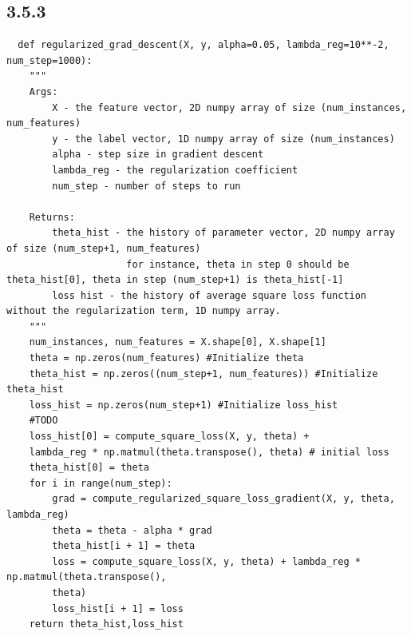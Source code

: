 \documentclass{article}
\begin{document}
\subsection{3.5.3}
\begin{verbatim}
  def regularized_grad_descent(X, y, alpha=0.05, lambda_reg=10**-2, num_step=1000):
    """
    Args:
        X - the feature vector, 2D numpy array of size (num_instances, num_features)
        y - the label vector, 1D numpy array of size (num_instances)
        alpha - step size in gradient descent
        lambda_reg - the regularization coefficient
        num_step - number of steps to run
    
    Returns:
        theta_hist - the history of parameter vector, 2D numpy array of size (num_step+1, num_features)
                     for instance, theta in step 0 should be theta_hist[0], theta in step (num_step+1) is theta_hist[-1]
        loss hist - the history of average square loss function without the regularization term, 1D numpy array.
    """
    num_instances, num_features = X.shape[0], X.shape[1]
    theta = np.zeros(num_features) #Initialize theta
    theta_hist = np.zeros((num_step+1, num_features)) #Initialize theta_hist
    loss_hist = np.zeros(num_step+1) #Initialize loss_hist
    #TODO
    loss_hist[0] = compute_square_loss(X, y, theta) + 
    lambda_reg * np.matmul(theta.transpose(), theta) # initial loss
    theta_hist[0] = theta
    for i in range(num_step):
        grad = compute_regularized_square_loss_gradient(X, y, theta, lambda_reg)
        theta = theta - alpha * grad
        theta_hist[i + 1] = theta
        loss = compute_square_loss(X, y, theta) + lambda_reg * np.matmul(theta.transpose(),
        theta)
        loss_hist[i + 1] = loss
    return theta_hist,loss_hist
\end{verbatim}
\endsubsection
\end{document}
